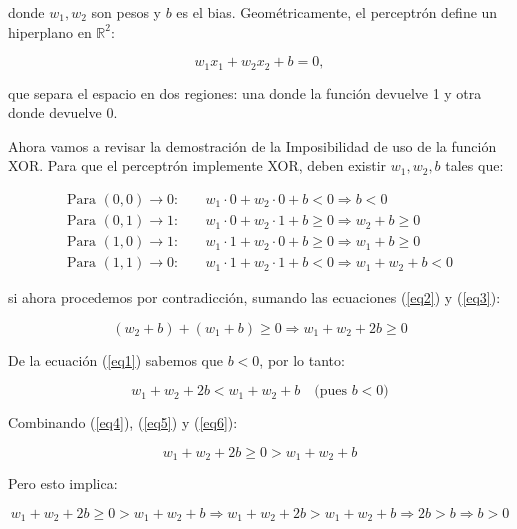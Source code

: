 \documentclass[12pt]{article}
\begin{document}
donde $w_1, w_2$ son pesos y $b$ es el bias. Geométricamente, el perceptrón define un hiperplano en $\mathbb{R}^2$:

\begin{equation}
w_1x_1 + w_2x_2 + b = 0,
\end{equation}

que separa el espacio en dos regiones: una donde la función devuelve 1 y otra donde devuelve 0.

Ahora vamos a revisar la demostración de la Imposibilidad de uso de la función XOR. Para que el perceptrón implemente XOR, deben existir $w_1, w_2, b$ tales que:

\begin{align}
\text{Para } (0,0) \rightarrow 0: &\quad w_1\cdot 0 + w_2\cdot 0 + b < 0 \Rightarrow b < 0 \label{eq1} \\
\text{Para } (0,1) \rightarrow 1: &\quad w_1\cdot 0 + w_2\cdot 1 + b \geq 0 \Rightarrow w_2 + b \geq 0 \label{eq2} \\
\text{Para } (1,0) \rightarrow 1: &\quad w_1\cdot 1 + w_2\cdot 0 + b \geq 0 \Rightarrow w_1 + b \geq 0 \label{eq3} \\
\text{Para } (1,1) \rightarrow 0: &\quad w_1\cdot 1 + w_2\cdot 1 + b < 0 \Rightarrow w_1 + w_2 + b < 0 \label{eq4}
\end{align}

si ahora procedemos  por contradicción, sumando las ecuaciones (\ref{eq2}) y (\ref{eq3}):

\begin{equation}
(w_2 + b) + (w_1 + b) \geq 0 \Rightarrow w_1 + w_2 + 2b \geq 0 \label{eq5}
\end{equation}

De la ecuación (\ref{eq1}) sabemos que $b < 0$, por lo tanto:

\begin{equation}
w_1 + w_2 + 2b < w_1 + w_2 + b \quad \text{(pues $b < 0$)} \label{eq6}
\end{equation}

Combinando (\ref{eq4}), (\ref{eq5}) y (\ref{eq6}):

\begin{equation}
w_1 + w_2 + 2b \geq 0 > w_1 + w_2 + b
\end{equation}

Pero esto implica:

\begin{equation}
w_1 + w_2 + 2b \geq 0 > w_1 + w_2 + b \Rightarrow w_1 + w_2 + 2b > w_1 + w_2 + b \Rightarrow 2b > b \Rightarrow b > 0
\end{equation}
\end{document}
